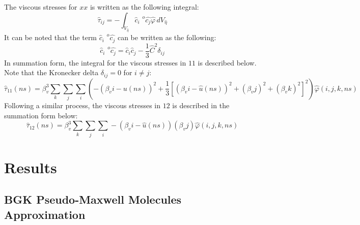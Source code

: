 \documentclass[a4paper]{article}
\begin{document}
The viscous stresses for $xx$ is written as the following integral:
\begin{equation}
    \hat{\tau}_{ij} = -\int_{V_{\hat{\eta}}} {\hat{c}_i}^{{\,\,\,o}}\hat{c_j} \hat{\varphi} \,dV_{\hat{\eta}}
\end{equation}
It can be noted that the term ${\hat{c}_i}^{{\,\,\,o}}\hat{c_j}$ can be written as the following:
\begin{equation}
    {\hat{c}_i}^{{\,\,\,o}}\hat{c_j} = \hat{c}_i \hat{c}_j - \dfrac{1}{3}\hat{C}^2\delta_{ij}
\end{equation}
In summation form, the integral for the viscous stresses in $11$ is described below. Note that the Kronecker delta $\delta_{ij} = 0$ for $i\neq j$:
\begin{equation}
    \hat{\tau}_{11}(ns) = \beta_v^3 \sum_k \sum_j \sum_i \left(-\left(\beta_v i - u(ns)\right)^2 + \dfrac{1}{3}\left[(\beta_v i - \hat{u}(ns))^2 + (\beta_v j)^2 + (\beta_v k)^2 \right]^2\right) \hat{\varphi}(i,j,k,ns)
\end{equation}
Following a similar process, the viscous stresses in $12$ is described in the summation form below:
\begin{equation}
    \hat{\tau}_{12}(ns) = \beta_v^3 \sum_k \sum_j \sum_i -(\beta_v i - \hat{u}(ns))(\beta_v j)  \hat{\varphi}(i,j,k,ns)
\end{equation}
\newpage
\section{Results}
\subsection{BGK Pseudo-Maxwell Molecules Approximation}
\end{document}
